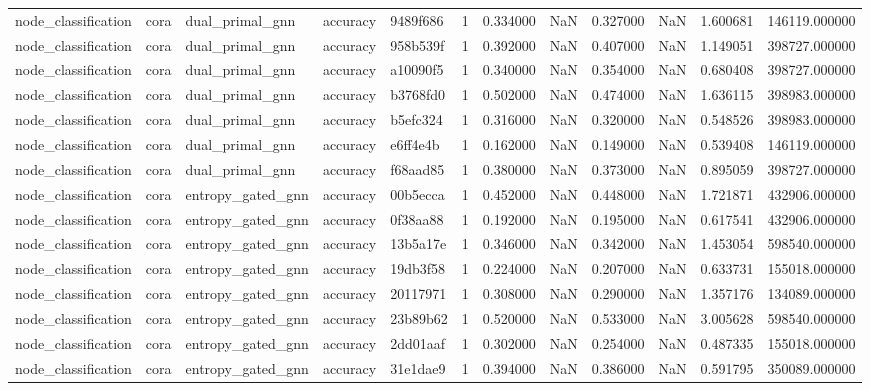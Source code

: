 \begin{tabular}{lllllrrrrrrr}
node_classification & cora & dual_primal_gnn & accuracy & 9489f686 & 1 & 0.334000 & NaN & 0.327000 & NaN & 1.600681 & 146119.000000 \\
node_classification & cora & dual_primal_gnn & accuracy & 958b539f & 1 & 0.392000 & NaN & 0.407000 & NaN & 1.149051 & 398727.000000 \\
node_classification & cora & dual_primal_gnn & accuracy & a10090f5 & 1 & 0.340000 & NaN & 0.354000 & NaN & 0.680408 & 398727.000000 \\
node_classification & cora & dual_primal_gnn & accuracy & b3768fd0 & 1 & 0.502000 & NaN & 0.474000 & NaN & 1.636115 & 398983.000000 \\
node_classification & cora & dual_primal_gnn & accuracy & b5efc324 & 1 & 0.316000 & NaN & 0.320000 & NaN & 0.548526 & 398983.000000 \\
node_classification & cora & dual_primal_gnn & accuracy & e6ff4e4b & 1 & 0.162000 & NaN & 0.149000 & NaN & 0.539408 & 146119.000000 \\
node_classification & cora & dual_primal_gnn & accuracy & f68aad85 & 1 & 0.380000 & NaN & 0.373000 & NaN & 0.895059 & 398727.000000 \\
node_classification & cora & entropy_gated_gnn & accuracy & 00b5ecca & 1 & 0.452000 & NaN & 0.448000 & NaN & 1.721871 & 432906.000000 \\
node_classification & cora & entropy_gated_gnn & accuracy & 0f38aa88 & 1 & 0.192000 & NaN & 0.195000 & NaN & 0.617541 & 432906.000000 \\
node_classification & cora & entropy_gated_gnn & accuracy & 13b5a17e & 1 & 0.346000 & NaN & 0.342000 & NaN & 1.453054 & 598540.000000 \\
node_classification & cora & entropy_gated_gnn & accuracy & 19db3f58 & 1 & 0.224000 & NaN & 0.207000 & NaN & 0.633731 & 155018.000000 \\
node_classification & cora & entropy_gated_gnn & accuracy & 20117971 & 1 & 0.308000 & NaN & 0.290000 & NaN & 1.357176 & 134089.000000 \\
node_classification & cora & entropy_gated_gnn & accuracy & 23b89b62 & 1 & 0.520000 & NaN & 0.533000 & NaN & 3.005628 & 598540.000000 \\
node_classification & cora & entropy_gated_gnn & accuracy & 2dd01aaf & 1 & 0.302000 & NaN & 0.254000 & NaN & 0.487335 & 155018.000000 \\
node_classification & cora & entropy_gated_gnn & accuracy & 31e1dae9 & 1 & 0.394000 & NaN & 0.386000 & NaN & 0.591795 & 350089.000000 \\

\end{tabular}
